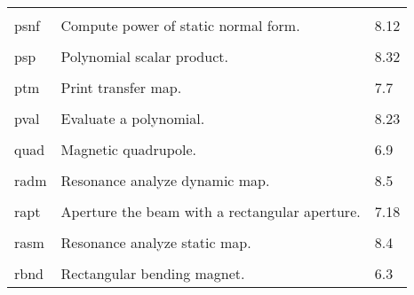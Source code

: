 \begin{center}
\begin{tabular}{lll}
\vspace{-3mm}& &\\
\hspace{1.5em}psnf    & Compute power of static normal form. &  \hspace{2em}8.12\\
\vspace{-3mm}& &\\
\hspace{1.5em}psp    &   Polynomial scalar product. & \hspace{2em}8.32\\
\vspace{-3mm}& &\\
\hspace{1.5em}ptm   &  Print transfer map.             & \hspace{2em}7.7\\
\vspace{-3mm}& &\\
\hspace{1.5em}pval    &   Evaluate a polynomial.       &  \hspace{2em}8.23\\
\vspace{-3mm}& &\\
\hspace{1.5em}quad    &    Magnetic quadrupole.   &  \hspace{2em}6.9 \\
\vspace{-3mm}& &\\
\hspace{1.5em}radm    &    Resonance analyze dynamic map. &  \hspace{2em}8.5\\
\vspace{-3mm}& &\\
\hspace{1.5em}rapt  & Aperture the beam with a rectangular aperture.& \hspace{2em}7.18\\
\vspace{-3mm}& &\\
\hspace{1.5em}rasm    &    Resonance analyze static map.  &  \hspace{2em}8.4\\
\vspace{-3mm}& &\\
\hspace{1.5em}rbnd    &    Rectangular bending magnet.  &  \hspace{2em}6.3\\

\end{tabular}
\end{center}
